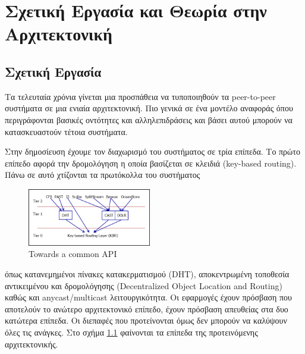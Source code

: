 \chapter{Σχετική Εργασία και Θεωρία στην Αρχιτεκτονική} 
\label{chap:Literature}

\section{Σχετική Εργασία}

Τα τελευταία χρόνια γίνεται μια προσπάθεια να τυποποιηθούν τα 
peer-to-peer συστήματα σε μια ενιαία αρχιτεκτονική. Πιο γενικά σε ένα 
μοντέλο αναφοράς όπου περιγράφονται βασικές οντότητες και 
αλληλεπιδράσεις και βάσει αυτού μπορούν να κατασκευαστούν τέτοια 
συστήματα.

Στην δημοσίευση \citep{F.Dabek2003} έχουμε τον διαχωρισμό του συστήματος 
σε τρία επίπεδα. Το πρώτο επίπεδο αφορά την δρομολόγηση η οποία βασίζεται σε κλειδιά 
(key-based routing). Πάνω σε αυτό χτίζονται τα πρωτόκολλα του συστήματος 
\begin{figure}
  \begin{center}
    \includegraphics[width=0.48\textwidth]{Figures/Related_work/Towards_a_common_API_(tiers).png}
  \end{center}
  \caption{Towards a common API}
  \label{fig:Α_common_API}
\end{figure}
όπως κατανεμημένοι πίνακες κατακερματισμού (DHT), αποκεντρωμένη 
τοποθεσία αντικειμένου και δρομολόγησης (Decentralized Object Location 
and Routing) καθώς και anycast/multicast λειτουργικότητα. Οι εφαρμογές 
έχουν πρόσβαση που αποτελούν το ανώτερο αρχιτεκτονικό επίπεδο, έχουν 
πρόσβαση απευθείας στα δυο κατώτερα επίπεδα. Οι διεπαφές που 
προτείνονται όμως δεν μπορούν να καλύψουν όλες τις ανάγκες. Στο σχήμα  
\ref{fig:Α_common_API} φαίνονται τα επίπεδα της προτεινόμενης αρχιτεκτονικής.

